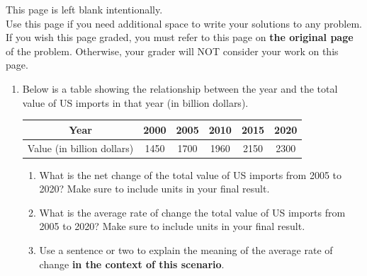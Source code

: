 \documentclass[11pt]{article}
\begin{document}
\vfill


\newpage

This page is left blank intentionally.\\

Use this page if you need additional space to write your solutions to any problem. \\

If you wish this page graded, you must refer to this page on \textbf{the original page} of the problem. Otherwise, your grader will NOT consider your work on this page.

\newpage%


\begin{enumerate}


\item Below is a table showing the relationship between the year and the total value of US imports in that year (in billion dollars).

\begin{table}[h!]
        \centering
        \begin{tabular}{|c|c|c|c|c|c|}
            \hline
            Year & 2000 & 2005 & 2010 & 2015 & 2020 \\
            \hline
            Value (in billion dollars) & 1450 & 1700 & 1960 & 2150 & 2300\\
            \hline
        \end{tabular}
    \end{table}

%

\begin{enumerate}
    \item What is the net change of the total value of US imports from 2005 to 2020? Make sure to include units in your final result.

    \vfill

    \item What is the average rate of change the total value of US imports from 2005 to 2020? Make sure to include units in your final result.

    \vfill

    \item Use a sentence or two to explain the meaning of the average rate of change \textbf{in the context of this scenario}. 
    

\end{enumerate}
\end{enumerate}
\end{document}
